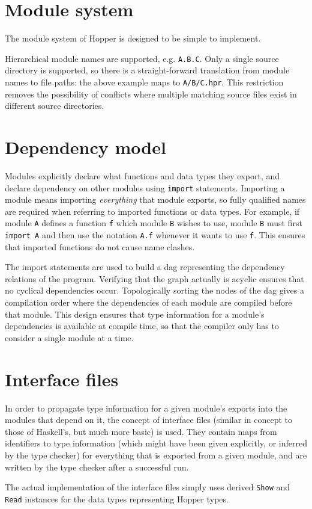 \section{Module system}
\label{sec:dai_modules}



The module system of Hopper is designed to be simple to implement.

Hierarchical module names are supported, e.g. \texttt{A.B.C}. Only a single source directory is supported, so there is a straight-forward translation from module names to file paths: the above example maps to \texttt{A/B/C.hpr}. This restriction removes the possibility of conflicts where multiple matching source files exist in different source directories.

\section{Dependency model}
Modules explicitly declare what functions and data types they export, and declare dependency on other modules using \texttt{import} statements. Importing a module means importing \emph{everything} that module exports, so fully qualified names are required when referring to imported functions or data types. For example, if module \texttt{A} defines a function \texttt{f} which module \texttt{B} wishes to use, module \texttt{B} must first \texttt{import A} and then use the notation \texttt{A.f} whenever it wants to use \texttt{f}.  This ensures that imported functions do not cause name clashes.

The import statements are used to build a \gls{dag} representing the dependency relations of the program. Verifying that the graph actually is acyclic ensures that no cyclical dependencies occur. Topologically sorting the nodes of the \gls{dag} gives a compilation order where the dependencies of each module are compiled before that module. This design ensures that type information for a module's dependencies is available at compile time, so that the compiler only has to consider a single module at a time.

\section{Interface files}
In order to propagate type information for a given module's exports into the modules that depend on it, the concept of interface files (similar in concept to those of Haskell's\cite{interfacefiles}, but much more basic) is used. They contain maps from identifiers to type information (which might have been given explicitly, or inferred by the type checker) for everything that is exported from a given module, and are written by the type checker after a successful run.

The actual implementation of the interface files simply uses derived \texttt{Show} and \texttt{Read} instances for the data types representing Hopper types.